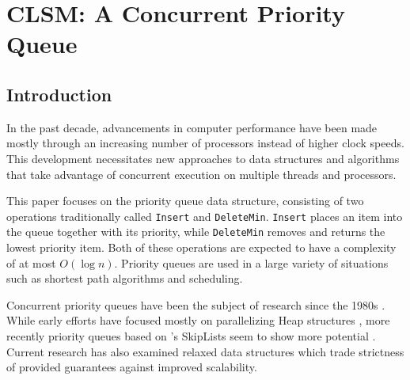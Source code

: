 \chapter{CLSM: A Concurrent Priority Queue}

\begin{comment}
Intro und related work kannst du sicher großteils vom Seminar übernehmen,
und dann ein Kapitel wo du die Implementierung beschreibst. Beweise für
linearisierbarkeit wären auch gut. Und dann benchmarks als Evaluierung.
\end{comment}

\section{Introduction}


In the past decade, advancements in computer performance have been made mostly
through an increasing number of processors instead of higher clock speeds.
This development necessitates new approaches to data structures and algorithms
that take advantage of concurrent execution on multiple threads and processors.


This paper focuses on the priority queue data structure, consisting of two operations
traditionally called \lstinline|Insert| and \lstinline|DeleteMin|. \lstinline|Insert|
places an item into the queue together with its priority, while \lstinline|DeleteMin|
removes and returns the lowest priority item. Both of these operations are expected to have
a complexity of at most $O(\log n)$. Priority queues are used in a large variety
of situations such as shortest path algorithms and scheduling. %


Concurrent priority queues have been the subject of research since the 1980s
\cite{ayani1990lr,biswas1987simultaneous,das1996distributed,deo1992parallel,huang1991evaluation,
luchetti1993some,mans1998portable,olariu1991optimal,prasad1995parallel}.
While early efforts have focused mostly on parallelizing Heap structures
\cite{hunt1996efficient},
more recently priority queues based on \citeauthor{pugh1990skip}'s SkipLists
\cite{pugh1990skip} seem to show more potential \cite{shavit2000skiplist,
sundell2003fast,herlihy2012art,linden2013skiplist}. Current research has also examined
relaxed data structures \cite{wimmer2013data,alistarhspraylist} which trade
strictness of provided guarantees against improved scalability.

